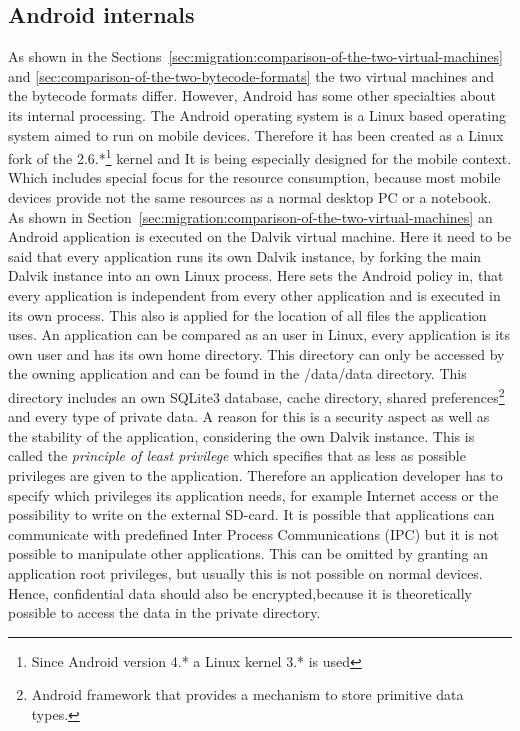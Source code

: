 \subsection{Android internals}
\label{sec:android-internals}
As shown in the Sections~\ref{sec:migration:comparison-of-the-two-virtual-machines} and \ref{sec:comparison-of-the-two-bytecode-formats} the two virtual machines and the bytecode formats differ.
However, Android has some other specialties about its internal processing.
The Android operating system is a Linux based operating system aimed to run on mobile devices.
Therefore it has been created as a Linux fork of the 2.6.*\footnote{Since Android version 4.* a Linux kernel 3.* is used} kernel and 
It is being especially designed for the mobile context.
Which includes special focus for the resource consumption, because most mobile devices provide not the same resources as a normal desktop PC or a notebook.
As shown in Section~\ref{sec:migration:comparison-of-the-two-virtual-machines} an Android application is executed on the Dalvik virtual machine.
Here it need to be said that every application runs its own Dalvik instance, by forking the main Dalvik instance into an own Linux process.
Here sets the Android policy in, that every application is independent from every other application and is executed in its own process.
This also is applied for the location of all files the application uses.
An application can be compared as an user in Linux, every application is its own user and has its own home directory.
This directory can only be accessed by the owning application and can be found in the /data/data directory.
This directory includes an own SQLite3 database, cache directory, shared preferences\footnote{Android framework that provides a mechanism to store primitive data types.} and every type of private data.
A reason for this is a security aspect as well as the stability of the application, considering the own Dalvik instance.
This is called the \textit{principle of least privilege} which specifies that as less as possible privileges are given to the application.
Therefore an application developer has to specify which privileges its application needs, for example Internet access or the possibility to write on the external SD-card.
It is possible that applications can communicate with predefined Inter Process Communications (IPC) but it is not possible to manipulate other applications.
This can be omitted by granting an application root privileges, but usually this is not possible on normal devices.
Hence, confidential data should also be encrypted,because it is theoretically possible to access the data in the private directory.
